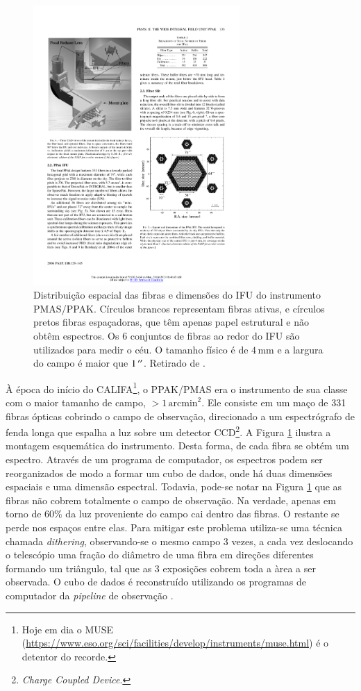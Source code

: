 \begin{figure}
	\includegraphics[width=0.7\textwidth]{figuras/PPAK}
	\caption[Distribuição das fibras no instrumento PMAS/PPAK]
	{Distribuição espacial das fibras e dimensões do IFU do instrumento PMAS/PPAK.
	Círculos brancos representam fibras ativas, e círculos pretos fibras
	espaçadoras, que têm apenas papel estrutural e não obtêm espectros. Os 6
	conjuntos de fibras ao redor do IFU são utilizados para medir o céu. O tamanho
	físico é de $4\,\mathrm{mm}$ e a largura do campo é maior que $1\,^{\prime\prime}$.
	Retirado de	\citet{Kelz2006}.}
	\label{fig:PPAK}
\end{figure}

À época do início do CALIFA\footnote{Hoje em dia o MUSE
(\url{https://www.eso.org/sci/facilities/develop/instruments/muse.html}) é o
detentor do recorde.}, o PPAK/PMAS era o instrumento de sua classe com o maior
tamanho de campo, $>1\,\mathrm{arcmin}^2$. Ele consiste em um maço de 331 fibras
ópticas cobrindo o campo de observação, direcionado a um espectrógrafo de fenda
longa que espalha a luz sobre um detector CCD\footnote{{\em Charge Coupled
Device}.}.
A Figura \ref{fig:PPAK} ilustra a montagem esquemática do instrumento. Desta
forma, de cada fibra se obtém um espectro. Através de um programa de computador,
os espectros podem ser reorganizados de modo a formar um cubo de dados, onde há
duas dimensões espaciais e uma dimensão espectral.
Todavia, pode-se notar na Figura \ref{fig:PPAK} que as fibras não cobrem
totalmente o campo de observação. Na verdade, apenas em torno de 60\% da luz
proveniente do campo cai dentro das fibras. O restante se perde nos espaços
entre elas. Para mitigar este problema utiliza-se uma técnica chamada {\em
dithering}, observando-se o mesmo campo 3 vezes, a cada vez deslocando o
telescópio uma fração do diâmetro de uma fibra em direções diferentes formando
um triângulo, tal que as 3 exposições cobrem toda a àrea a ser observada. O cubo
de dados é reconstruído utilizando os programas de computador da {\em pipeline}
de observação \citep{Sanchez2012}.

